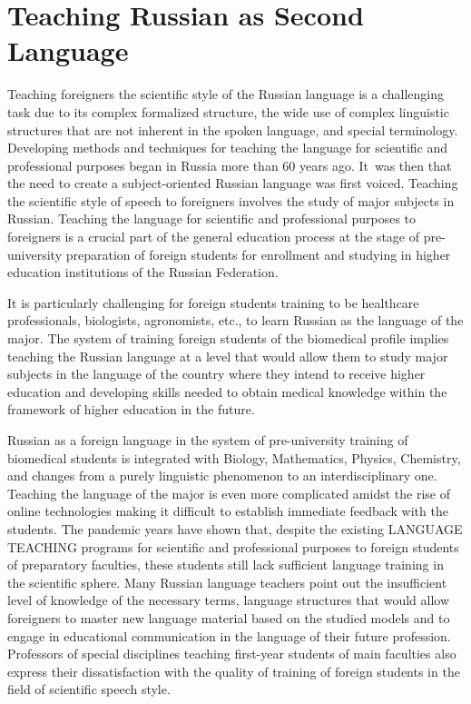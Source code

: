 \documentclass[english]{textolivre}
\begin{document}
\section{Teaching Russian as Second Language}\label{sec-formato}
Teaching foreigners the scientific style of the Russian language is a challenging task due to its complex formalized structure, the wide use of complex linguistic structures that are not inherent in the spoken language, and special terminology. Developing methods and techniques for teaching the language for scientific and professional purposes began in Russia more than 60 years ago. It was then that the need to create a subject-oriented Russian language was first voiced. Teaching the scientific style of speech to foreigners involves the study of major subjects in Russian. Teaching the language for scientific and professional purposes to foreigners is a crucial part of the general education process at the stage of pre-university preparation of foreign students for enrollment and studying in higher education institutions of the Russian Federation.

It is particularly challenging for foreign students training to be healthcare professionals, biologists, agronomists, etc., to learn Russian as the language of the major. The system of training foreign students of the biomedical profile implies teaching the Russian language at a level that would allow them to study major subjects in the language of the country where they intend to receive higher education and developing skills needed to obtain medical knowledge within the framework of higher education in the future.

Russian as a foreign language in the system of pre-university training of biomedical students is integrated with Biology, Mathematics, Physics, Chemistry, and changes from a purely linguistic phenomenon to an interdisciplinary one. Teaching the language of the major is even more complicated amidst the rise of online technologies making it difficult to establish immediate feedback with the students. The pandemic years have shown that, despite the existing LANGUAGE TEACHING programs for scientific and professional purposes to foreign students of preparatory faculties, these students still lack sufficient language training in the scientific sphere. Many Russian language teachers point out the insufficient level of knowledge of the necessary terms, language structures that would allow foreigners to master new language material based on the studied models and to engage in educational communication in the language of their future profession. Professors of special disciplines teaching first-year students of main faculties also express their dissatisfaction with the quality of training of foreign students in the field of scientific speech style.
\end{document}
